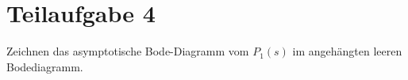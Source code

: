 \section{Teilaufgabe 4}
\begin{aufgabe}
    Zeichnen das asymptotische Bode-Diagramm vom $P_1(s)$ im angehängten 
    leeren Bodediagramm.
\end{aufgabe}
